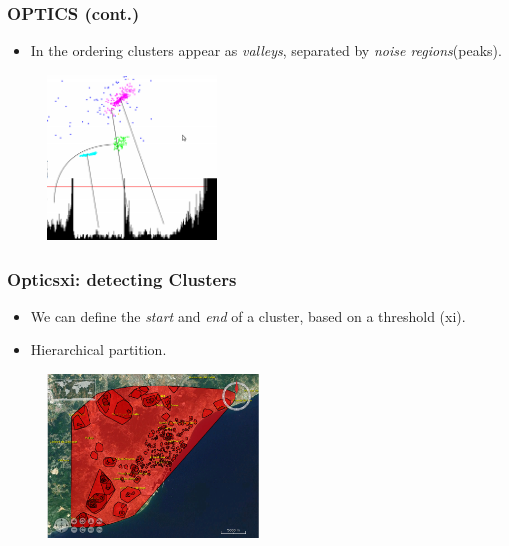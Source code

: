 \documentclass[hyperref={pdfpagelabels=true}]{beamer}
\begin{document}
\begin{frame}
\frametitle{OPTICS (cont.)}
\begin{itemize}
      \item<1->In the ordering clusters appear as \textit{valleys}, separated by \textit{noise regions}(peaks). 
\end{itemize}                
  \begin{figure}   
    \includegraphics[width=0.4\textwidth]{dendrogram.png}   
  \end{figure}     
\end{frame}


\begin{frame}
\frametitle{Opticsxi: detecting Clusters}
\begin{itemize}
      \item<1->We can define the \textit{start} and \textit{end} of a cluster, based on a threshold (xi).%
      \item<1->Hierarchical partition.%
\end{itemize}                
  \begin{figure}   
    \includegraphics[width=0.5\textwidth]{2000_025_100_w_removal.png}   
  \end{figure}     
\end{frame}
\end{document}
